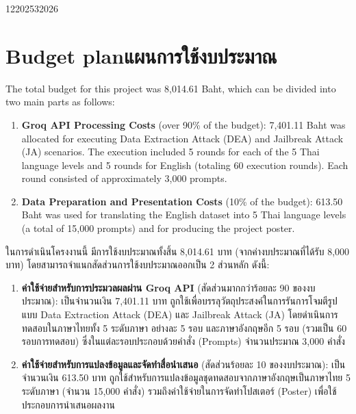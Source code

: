 \begin{plan}{12}{2025}{3}{2026}
\end{plan}

\section{\ifenglish Budget plan\else แผนการใช้งบประมาณ\fi}

\ifenglish
The total budget for this project was 8,014.61 Baht, which can be divided into two main parts as follows:
\begin{enumerate}
    \item \textbf{Groq API Processing Costs} (over 90\% of the budget): 7,401.11 Baht was allocated for executing Data Extraction Attack (DEA) and Jailbreak Attack (JA) scenarios. The execution included 5 rounds for each of the 5 Thai language levels and 5 rounds for English (totaling 60 execution rounds). Each round consisted of approximately 3,000 prompts.
    \item \textbf{Data Preparation and Presentation Costs} (10\% of the budget): 613.50 Baht was used for translating the English dataset into 5 Thai language levels (a total of 15,000 prompts) and for producing the project poster.
\end{enumerate}
\else
ในการดำเนินโครงงานนี้ มีการใช้งบประมาณทั้งสิ้น 8,014.61 บาท (จากค่างบประมาณที่ได้รับ 8,000 บาท) โดยสามารถจำแนกสัดส่วนการใช้งบประมาณออกเป็น 2 ส่วนหลัก ดังนี้:
\begin{enumerate}
    \item \textbf{ค่าใช้จ่ายสำหรับการประมวลผลผ่าน Groq API} (สัดส่วนมากกว่าร้อยละ 90 ของงบประมาณ): เป็นจำนวนเงิน 7,401.11 บาท ถูกใช้เพื่อบรรลุวัตถุประสงค์ในการรันการโจมตีรูปแบบ Data Extraction Attack (DEA) และ Jailbreak Attack (JA) โดยดำเนินการทดสอบในภาษาไทยทั้ง 5 ระดับภาษา อย่างละ 5 รอบ และภาษาอังกฤษอีก 5 รอบ (รวมเป็น 60 รอบการทดสอบ) ซึ่งในแต่ละรอบประกอบด้วยคำสั่ง (Prompts) จำนวนประมาณ 3,000 คำสั่ง
    \item \textbf{ค่าใช้จ่ายสำหรับการแปลงข้อมูลและจัดทำสื่อนำเสนอ} (สัดส่วนร้อยละ 10 ของงบประมาณ): เป็นจำนวนเงิน 613.50 บาท ถูกใช้สำหรับการแปลงข้อมูลชุดทดสอบจากภาษาอังกฤษเป็นภาษาไทย 5 ระดับภาษา (จำนวน 15,000 คำสั่ง) รวมถึงค่าใช้จ่ายในการจัดทำโปสเตอร์ (Poster) เพื่อใช้ประกอบการนำเสนอผลงาน
\end{enumerate}
\fi

